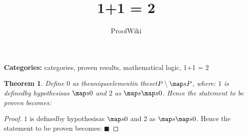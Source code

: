 \documentclass{article}
\title{1+1 = 2}
\author{ProofWiki}
\date{}
\newtheorem{theorem}{Theorem}
\begin{document}
\maketitle

\noindent\textbf{Categories:} categories, proven results, mathematical logic, 1+1 = 2

\begin{theorem}
Define $0$ as theuniqueelementin theset$P \setminus \map s P$, where: $1$ is definedby hypothesisas $\map s 0$ and $2$ as $\map s {\map s 0}$. Hence the statement to be proven becomes:
\end{theorem}

\begin{proof}
$1$ is definedby hypothesisas $\map s 0$ and $2$ as $\map s {\map s 0}$. Hence the statement to be proven becomes: $\blacksquare$
\end{proof}
\end{document}
